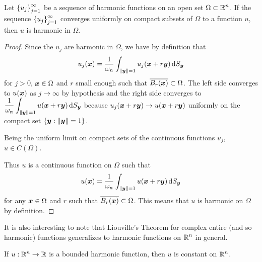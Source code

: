 \begin{cor} \label{UnifConvHarm}
Let $\displaystyle \left\{ u_j \right\}_{j=1}^\infty$ be a sequence of
harmonic functions on an open set $\displaystyle \Omega \subset \mathbb{R}^n$.
If the sequence $\displaystyle \left\{ u_j \right\}_{j=1}^\infty$
converges uniformly on compact subsets of $\Omega$ to a function $u$,
then $u$ is harmonic in $\Omega$.
\end{cor}

\begin{proof}
Since the $u_j$ are harmonic in $\Omega$, we have by
definition that
\[
u_j({\bm{x}}) = \frac{1}{\omega_n} \int_{\|{\bm{y}}\|=1}
u_j({\bm{x}}+r{\bm{y}}) \,\mathrm{d}{S}_{{\bm{y}}}
\]
for $j>0$, ${\bm{x}}\in \Omega$ and $r$ small enough such that
$\overline{B_r({\bm{x}})} \subset \Omega$.  The left side converges to
$u({\bm{x}})$ as $j\rightarrow \infty$ by hypothesis and the right side
converges to $\displaystyle \frac{1}{\omega_n} \int_{\|{\bm{y}}\|=1}
u({\bm{x}}+r{\bm{y}}) \,\mathrm{d}{S}_{{\bm{y}}}$ because 
$u_j({\bm{x}}+r{\bm{y}}) \rightarrow u({\bm{x}}+r{\bm{y}})$ uniformly
on the compact set $\{ {\bm{y}} : \|{\bm{y}}\|=1\}$.

Being the uniform limit on compact sets of the continuous functions
$u_j$, $u\in C(\Omega)$.

Thus $u$ is a continuous function on $\Omega$ such that
\[
u({\bm{x}}) = \frac{1}{\omega_n} \int_{\|{\bm{y}}\|=1}
u({\bm{x}}+r{\bm{y}}) \,\mathrm{d}{S}_{{\bm{y}}}
\]
for any ${\bm{x}} \in \Omega$ and $r$ such that
$\overline{B_r({\bm{x}})} \subset \Omega$.  This means that $u$ is
harmonic on $\Omega$ by definition.
\end{proof}

It is also interesting to note that Liouville's Theorem for complex
entire (and so harmonic) functions generalizes to harmonic
functions on $\displaystyle \mathbb{R}^n$ in general.

\begin{theorem}
If $\displaystyle u:\mathbb{R}^n \rightarrow \mathbb{R}$ is a bounded harmonic
function, then $u$ is constant on $\displaystyle \mathbb{R}^n$.
\end{theorem}

